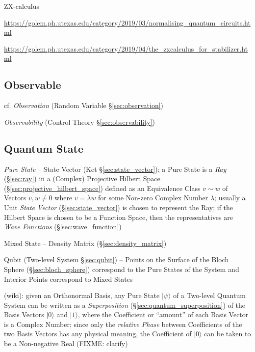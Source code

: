 ZX-calculus

\url{https://golem.ph.utexas.edu/category/2019/03/normalising_quantum_circuits.html}

\url{https://golem.ph.utexas.edu/category/2019/04/the_zxcalculus_for_stabilizer.html}



\subsection{Observable}\label{sec:observable}

cf. \emph{Observation} (Random Variable \S\ref{sec:observation})

\emph{Observability} (Control Theory \S\ref{sec:observability})



\subsection{Quantum State}\label{sec:quantum_state}

\emph{Pure State} -- State Vector (Ket \S\ref{sec:state_vector}); a Pure State
is a \emph{Ray} (\S\ref{sec:ray}) in a (Complex) Projective Hilbert Space
(\S\ref{sec:projective_hilbert_space}) defined as an Equivalence Class $v \sim
w$ of Vectors $v, w \neq 0$ where $v = \lambda w$ for some Non-zero Complex
Number $\lambda$; usually a Unit \emph{State Vector} (\S\ref{sec:state_vector})
is chosen to represent the Ray; if the Hilbert Space is chosen to be a Function
Space, then the representatives are \emph{Wave Functions}
(\S\ref{sec:wave_function})

Mixed State -- Density Matrix (\S\ref{sec:density_matrix})

Qubit (Two-level System \S\ref{sec:qubit}) -- Points on the Surface of the Bloch
Sphere (\S\ref{sec:bloch_sphere}) correspond to the Pure States of the System
and Interior Points correspond to Mixed States

(wiki): given an Orthonormal Basis, any Pure State $|\psi\rangle$ of a Two-level
Quantum System can be written as a \emph{Superposition}
(\S\ref{sec:quantum_superposition}) of the Basis Vectors $|0\rangle$ and
$|1\rangle$, where the Coefficient or ``amount'' of each Basis Vector is a
Complex Number; since only the \emph{relative Phase} between Coefficients of the
two Basis Vectors has any physical meaning, the Coefficient of $|0\rangle$ can
be taken to be a Non-negative Real (FIXME: clarify)

